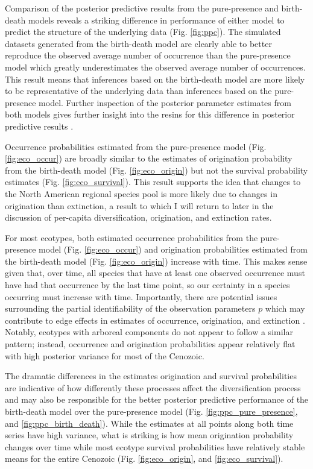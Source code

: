 \documentclass[12pt,letterpaper]{article}
\begin{document}
Comparison of the posterior predictive results from the pure-presence and birth-death models reveals a striking difference in performance of either model to predict the structure of the underlying data (Fig. \ref{fig:ppc}). The simulated datasets generated from the birth-death model are clearly able to better reproduce the observed average number of occurrence than the pure-presence model which greatly underestimates the observed average number of occurrences. This result means that inferences based on the birth-death model are more likely to be representative of the underlying data than inferences based on the pure-presence model. Further inspection of the posterior parameter estimates from both models gives further insight into the resins for this difference in posterior predictive results \citep{Gelman2013d}. 


Occurrence probabilities estimated from the pure-presence model (Fig. \ref{fig:eco_occur}) are broadly similar to the estimates of origination probability from the birth-death model (Fig. \ref{fig:eco_origin}) but not the survival probability estimates (Fig. \ref{fig:eco_survival}). This result supports the idea that changes to the North American regional species pool is more likely due to changes in origination than extinction, a result to which I will return to later in the discussion of per-capita diversification, origination, and extinction rates.

For most ecotypes, both estimated occurrence probabilities from the pure-presence model (Fig. \ref{fig:eco_occur}) and origination probabilities estimated from the birth-death model (Fig. \ref{fig:eco_origin}) increase with time. This makes sense given that, over time, all species that have at least one observed occurrence must have had that occurrence by the last time point, so our certainty in a species occurring must increase with time. Importantly, there are potential issues surrounding the partial identifiability of the observation parameters \(p\) which may contribute to edge effects in estimates of occurrence, origination, and extinction \citep{Royle2008}. Notably, ecotypes with arboreal components do not appear to follow a similar pattern; instead, occurrence and origination probabilities appear relatively flat with high posterior variance for most of the Cenozoic.

The dramatic differences in the estimates origination and survival probabilities are indicative of how differently these processes affect the diversification process and may also be responsible for the better posterior predictive performance of the birth-death model over the pure-presence model (Fig. \ref{fig:ppc_pure_presence}, and \ref{fig:ppc_birth_death}). While the estimates at all points along both time series have high variance, what is striking is how mean origination probability changes over time while most ecotype survival probabilities have relatively stable means for the entire Cenozoic (Fig. \ref{fig:eco_origin}, and \ref{fig:eco_survival}).
\end{document}
